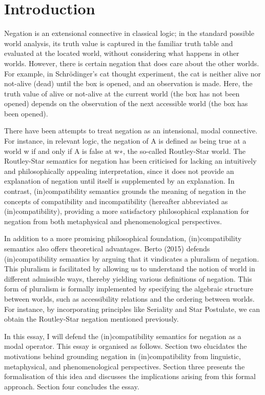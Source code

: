 \section{Introduction}

Negation is an extensional connective in classical logic; in the standard possible world analysis, its truth value is captured in the familiar truth table and evaluated at the located world, without considering what happens in other worlds. However, there is certain negation that does care about the other worlds. For example, in Schrödinger's cat thought experiment, the cat is neither alive nor not-alive (dead) until the box is opened, and an observation is made. Here, the truth value of alive or not-alive at the current world (the box has not been opened) depends on the observation of the next accessible world (the box has been opened). 

There have been attempts to treat negation as an intensional, modal connective. For instance, in relevant logic, the negation of A is defined as being true at a world w if and only if A is false at w∗, the so-called Routley-Star world. The Routley-Star semantics for negation has been criticised for lacking an intuitively and philosophically appealing interpretation, since it does not provide an explanation of negation until itself is supplemented by an explanation. In contrast, (in)compatibility semantics grounds the meaning of negation in the concepts of compatibility and incompatibility (hereafter abbreviated as (in)compatibility), providing a more satisfactory philosophical explanation for negation from both metaphysical and phenomenological perspectives. 

In addition to a more promising philosophical foundation, (in)compatibility semantics also offers theoretical advantages. Berto (2015) defends (in)compatibility semantics by arguing that it vindicates a pluralism of negation. This pluralism is facilitated by allowing us to understand the notion of world in different admissible ways, thereby yielding various definitions of negation. This form of pluralism is formally implemented by specifying the algebraic structure between worlds, such as accessibility relations and the ordering between worlds. For instance, by incorporating principles like Seriality and Star Postulate, we can obtain the Routley-Star negation mentioned previously. 

In this essay, I will defend the (in)compatibility semantics for negation as a modal operator. This essay is organised as follows. Section two elucidates the motivations behind grounding negation in (in)compatibility from linguistic, metaphysical, and phenomenological perspectives. Section three presents the formalisation of this idea and discusses the implications arising from this formal approach. Section four concludes the essay.

